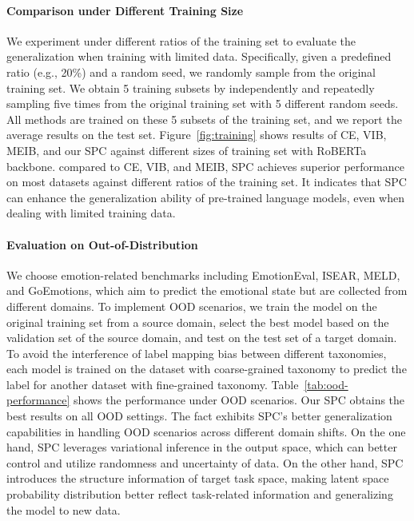 \documentclass[letterpaper]{article} %
\begin{document}
\paragraph{Comparison under Different Training Size}
We experiment under different ratios of the training set to evaluate the generalization when training with limited data. 
Specifically, given a predefined ratio (e.g., 20\%) and a random seed, we randomly sample from the original training set. 
We obtain 5 training subsets by independently and repeatedly sampling five times from the original training set with 5 different random seeds.
All methods are trained on these 5 subsets of the training set, and we report the average results on the test set. 
Figure~\ref{fig:training} shows results of CE, VIB, MEIB, and our SPC against different sizes of training set with RoBERTa backbone. 
compared to CE, VIB, and MEIB, SPC achieves superior performance on most datasets against different ratios of the training set.
It indicates that SPC can enhance the generalization ability of pre-trained language models, even when dealing with limited training data.





\paragraph{Evaluation on Out-of-Distribution}
We choose emotion-related benchmarks including EmotionEval, ISEAR, MELD, and GoEmotions, which aim to predict the emotional state but are collected from different domains.
To implement OOD scenarios, we train the model on the original training set from a source domain, select the best model based on the validation set of the source domain, and test on the test set of a target domain. 
To avoid the interference of label mapping bias between different taxonomies, each model is trained on the dataset with coarse-grained taxonomy to predict the label for another dataset with fine-grained taxonomy.
Table~\ref{tab:ood-performance} shows the performance under OOD scenarios.
Our SPC obtains the best results on all OOD settings. The fact exhibits SPC's better generalization capabilities in handling OOD scenarios across different domain shifts. 
On the one hand, SPC leverages variational inference in the output space, which can better control and utilize randomness and uncertainty of data. 
On the other hand, SPC introduces the structure information of target task space, making latent space probability distribution better reflect task-related information and generalizing the model to new data.
\end{document}
